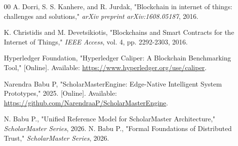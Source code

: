 \documentclass[conference]{IEEEtran}
\begin{document}
\begin{thebibliography}{00}
A. Dorri, S. S. Kanhere, and R. Jurdak, 
"Blockchain in internet of things: challenges and solutions," 
\textit{arXiv preprint arXiv:1608.05187}, 2016.

K. Christidis and M. Devetsikiotis, 
"Blockchains and Smart Contracts for the Internet of Things," 
\textit{IEEE Access}, vol. 4, pp. 2292-2303, 2016.

Hyperledger Foundation,
"Hyperledger Caliper: A Blockchain Benchmarking Tool,"
[Online]. Available: \url{https://www.hyperledger.org/use/caliper}.

Narendra Babu P, "ScholarMasterEngine: Edge-Native Intelligent System Prototypes," 2025. [Online]. Available: \url{https://github.com/NarendraaP/ScholarMasterEngine}.


 N. Babu P., "Unified Reference Model for ScholarMaster Architecture," \textit{ScholarMaster Series}, 2026.
 N. Babu P., "Formal Foundations of Distributed Trust," \textit{ScholarMaster Series}, 2026.
\end{thebibliography}
\end{document}
